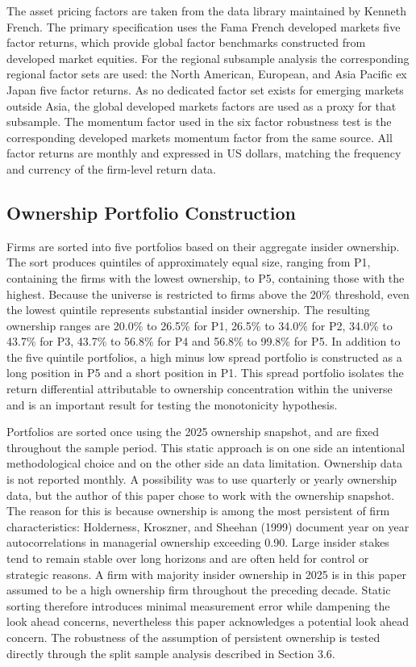 The asset pricing factors are taken from the data library maintained by Kenneth French. The primary specification uses the Fama French developed markets five factor returns, which provide global factor benchmarks constructed from developed market equities. For the regional subsample analysis the corresponding regional factor sets are used: the North American, European, and Asia Pacific ex Japan five factor returns. As no dedicated factor set exists for emerging markets outside Asia, the global developed markets factors are used as a proxy for that subsample. The momentum factor used in the six factor robustness test is the corresponding developed markets momentum factor from the same source. All factor returns are monthly and expressed in US dollars, matching the frequency and currency of the firm-level return data.


\subsection{Ownership Portfolio Construction}

Firms are sorted into five portfolios based on their aggregate insider ownership. The sort produces quintiles of approximately equal size, ranging from P1, containing the firms with the lowest ownership, to P5, containing those with the highest. Because the universe is restricted to firms above the 20\% threshold, even the lowest quintile represents substantial insider ownership. The resulting ownership ranges are 20.0\% to 26.5\% for P1, 26.5\% to 34.0\% for P2, 34.0\% to 43.7\% for P3, 43.7\% to 56.8\% for P4 and 56.8\% to 99.8\% for P5. In addition to the five quintile portfolios, a high minus low spread portfolio is constructed as a long position in P5 and a short position in P1. This spread portfolio isolates the return differential attributable to ownership concentration within the universe and is an important result for testing the monotonicity hypothesis.

Portfolios are sorted once using the 2025 ownership snapshot, and are fixed throughout the sample period. This static approach is on one side an intentional methodological choice and on the other side an data limitation. Ownership data is not reported monthly. A possibility was to use quarterly or yearly ownership data, but the author of this paper chose to work with the ownership snapshot. The reason for this is because ownership is among the most persistent of firm characteristics: Holderness, Kroszner, and Sheehan (1999) document year on year autocorrelations in managerial ownership exceeding 0.90. Large insider stakes tend to remain stable over long horizons and are often held for control or strategic reasons. A firm with majority insider ownership in 2025 is in this paper assumed to be a high ownership firm throughout the preceding decade. Static sorting therefore introduces minimal measurement error while dampening the look ahead concerns, nevertheless this paper acknowledges a potential look ahead concern. The robustness of the assumption of persistent ownership is tested directly through the split sample analysis described in Section 3.6.

